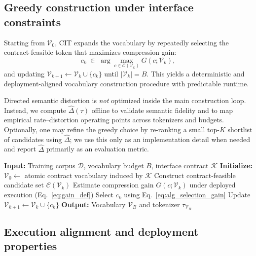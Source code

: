 \subsection{Greedy construction under interface constraints}
\label{sec:alg_greedy}

Starting from $\mathcal{V}_0$, CIT expands the vocabulary by repeatedly selecting the contract-feasible token that maximizes compression gain:
\begin{equation}
c_k
\;\in\;
\arg\max_{c \in \mathcal{C}(\mathcal{V}_k)}
G(c;\mathcal{V}_k),
\label{eq:alg_selection_gain}
\end{equation}
and updating $\mathcal{V}_{k+1}\leftarrow \mathcal{V}_k\cup\{c_k\}$ until $|\mathcal{V}_k|=B$.
This yields a deterministic and deployment-aligned vocabulary construction procedure with predictable runtime.

Directed semantic distortion is \emph{not} optimized inside the main construction loop.
Instead, we compute $\widehat{\Delta}(\tau)$ offline to validate semantic fidelity and to map empirical rate--distortion operating points across tokenizers and budgets.
Optionally, one may refine the greedy choice by re-ranking a small top-$K$ shortlist of candidates using $\widehat{\Delta}$; we use this only as an implementation detail when needed and report $\widehat{\Delta}$ primarily as an evaluation metric.

\begin{algorithm}[t]
\caption{Controlled Interface Tokenization (CIT)}
\label{alg:cit}
\begin{algorithmic}[1]
\State \textbf{Input:} Training corpus $\mathcal{D}$, vocabulary budget $B$, interface contract $\mathcal{K}$
\State \textbf{Initialize:} $\mathcal{V}_0 \leftarrow$ atomic contract vocabulary induced by $\mathcal{K}$
    \State Construct contract-feasible candidate set $\mathcal{C}(\mathcal{V}_k)$
        \State Estimate compression gain $G(c;\mathcal{V}_k)$ under deployed execution (Eq.~\eqref{eq:gain_def})
    \EndFor
    \State Select $c_k$ using Eq.~\eqref{eq:alg_selection_gain}
    \State Update $\mathcal{V}_{k+1} \leftarrow \mathcal{V}_k \cup \{c_k\}$
\EndFor
\State \textbf{Output:} Vocabulary $\mathcal{V}_B$ and tokenizer $\tau_{\mathcal{V}_B}$
\end{algorithmic}
\end{algorithm}


\subsection{Execution alignment and deployment properties}
\label{sec:alg_execution}

